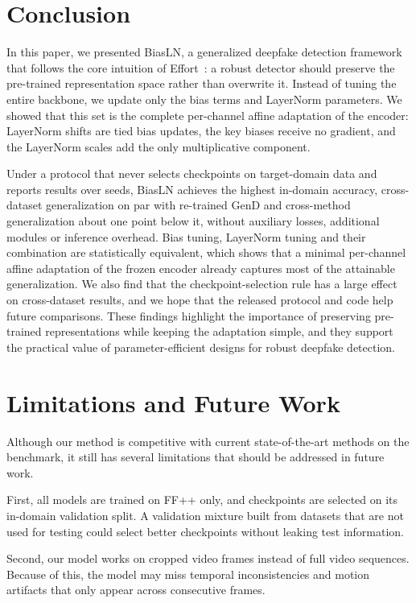 \documentclass[fonts]{icst}
\newif\ifrevmark\revmarkfalse
\newcommand{\rev}[1]{\ifrevmark{\color{revblue}#1}\else#1\fi}
\begin{document}
\section{Conclusion}

In this paper, we presented BiasLN, a generalized deepfake detection framework that follows the core intuition of Effort~\cite{yan2025effort}: a robust detector should preserve the pre-trained representation space \rev{rather than overwrite it}.
Instead of tuning the entire backbone, we update only the bias terms and LayerNorm parameters. \rev{We showed that this set is the complete per-channel affine adaptation of the encoder: LayerNorm shifts are tied bias updates, the key biases receive no gradient, and the LayerNorm scales add the only multiplicative component.}

\rev{Under a protocol that never selects checkpoints on target-domain data and reports results over seeds, BiasLN achieves the highest in-domain accuracy, cross-dataset generalization on par with re-trained GenD and cross-method generalization about one point below it, without auxiliary losses, additional modules or inference overhead. Bias tuning, LayerNorm tuning and their combination are statistically equivalent, which shows that a minimal per-channel affine adaptation of the frozen encoder already captures most of the attainable generalization.}
\rev{We also find that the checkpoint-selection rule has a large effect on cross-dataset results, and we hope that the released protocol and code help future comparisons.}
These findings highlight the importance of preserving pre-trained representations while keeping the adaptation simple, and they support the practical value of parameter-efficient designs for robust deepfake detection.

\section{Limitations and Future Work}
\label{sec:limits}
Although our method \rev{is competitive with} current state-of-the-art methods on the benchmark, it still has several limitations that should be addressed in future work.

\rev{First, all models are trained on FF++ only, and checkpoints are selected on its in-domain validation split. A validation mixture built from datasets that are not used for testing could select better checkpoints without leaking test information.}

Second, our model works on cropped video frames instead of full video sequences.
Because of this, the model may miss temporal inconsistencies and motion artifacts that only appear across consecutive frames.
\end{document}

